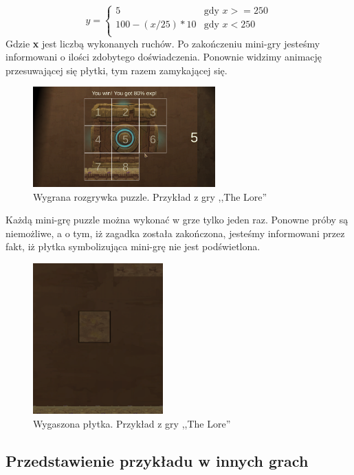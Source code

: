 \documentclass[oneside,polski,logo]{amuthesis}
\begin{document}
$$
y = \left\{ \begin{array}{ll}
5 & \textrm{gdy $x>=250$}\\
100 - (x / 25) * 10 & \textrm{gdy $x<250$}\\
\end{array} \right.
$$
Gdzie \textbf{x} jest liczbą wykonanych ruchów.
Po zakończeniu mini-gry jesteśmy informowani o ilości zdobytego doświadczenia. Ponownie widzimy animację przesuwającej się płytki, tym razem zamykającej się.
\begin{figure}[h]
	\centering
	\includegraphics[width=7cm]{images/tyrek/puzzle_end.png}
	\caption{Wygrana rozgrywka puzzle. Przykład z gry ,,The Lore''}
\end{figure}

Każdą mini-grę puzzle można wykonać w grze tylko jeden raz. Ponowne próby są niemożliwe, a o tym, iż zagadka została zakończona, jesteśmy informowani przez fakt, iż płytka symbolizująca mini-grę nie jest podświetlona.

\begin{figure}[h]
	\centering
	\includegraphics[width=5cm]{images/tyrek/puzzleWin.png}
	\caption{Wygaszona płytka. Przykład z gry ,,The Lore''}
\end{figure}


\subsection{Przedstawienie przykładu w innych grach}
\end{document}
